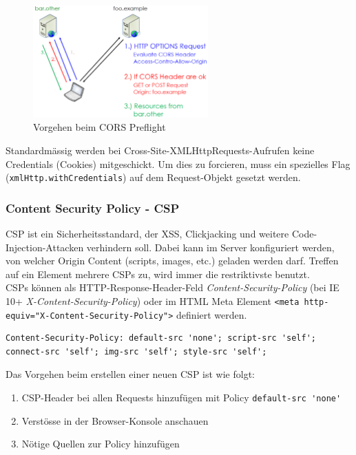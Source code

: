 \begin{figure}[H]
	\centering
	\includegraphics[width=0.6\textwidth]{./img/cors-preflight}
	\caption{Vorgehen beim CORS Preflight}
\end{figure}

Standardmässig werden bei Cross-Site-XMLHttpRequests-Aufrufen keine Credentials (Cookies) mitgeschickt. Um dies zu forcieren, muss ein spezielles Flag (\lstinline|xmlHttp.withCredentials|) auf dem Request-Objekt gesetzt werden.

\subsubsection{Content Security Policy - CSP}
CSP ist ein Sicherheitsstandard, der XSS, Clickjacking und weitere Code-Injection-Attacken verhindern soll. Dabei kann im Server konfiguriert werden, von welcher Origin Content (scripts, images, etc.) geladen werden darf. Treffen auf ein Element mehrere CSPs zu, wird immer die restriktivste benutzt.\\
CSPs können als HTTP-Response-Header-Feld \textit{Content-Security-Policy} (bei IE 10+ \textit{X-Content-Security-Policy}) oder im HTML Meta Element \lstinline|<meta http-equiv="X-Content-Security-Policy">| definiert werden.

\begin{lstlisting}[caption=Starter Policy für CSP-Header, language={}]
Content-Security-Policy: default-src 'none'; script-src 'self'; connect-src 'self'; img-src 'self'; style-src 'self';
\end{lstlisting}

Das Vorgehen beim erstellen einer neuen CSP ist wie folgt:
\begin{enumerate}
	\item CSP-Header bei allen Requests hinzufügen mit Policy \lstinline[language=clean]|default-src 'none'|
	\item Verstösse in der Browser-Konsole anschauen
	\item Nötige Quellen zur Policy hinzufügen
\end{enumerate}

